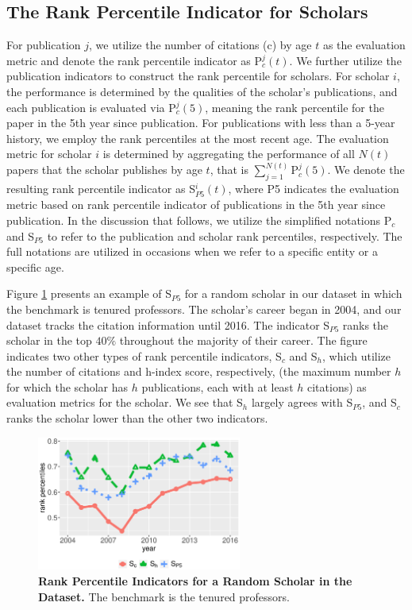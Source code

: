 \subsection*{The Rank Percentile Indicator for Scholars}

For publication $j$, we utilize the number of citations (c) by age $t$ as the evaluation metric and denote the rank percentile indicator as P$_c^{j}(t)$. We further utilize the publication indicators to construct the rank percentile for scholars. For scholar $i$, the performance is determined by the qualities of the scholar's publications, and each publication is evaluated via P$_c^{j}(5)$, meaning the rank percentile for the paper in the 5th year since publication. For publications with less than a 5-year history, we employ the rank percentiles at the most recent age. The evaluation metric for scholar $i$ is determined by aggregating the performance of all $N(t)$ papers that the scholar publishes by age $t$, that is $\displaystyle \sum_{j=1}^{N(t)} \text{P}_c^{j}(5)$. We denote the resulting rank percentile indicator as S$_{P5}^{i}(t)$, where P5 indicates the evaluation metric based on rank percentile indicator of publications in the 5th year since publication. In the discussion that follows, we utilize the simplified notations P$_c$ and S$_{P5}$ to refer to the publication and scholar rank percentiles, respectively. The full notations are utilized in occasions when we refer to a specific entity or a specific age. 

Figure \ref{fig:auti} presents an example of S$_{P5}$ for a random scholar in our dataset in which the benchmark is tenured professors. The scholar's career began in 2004, and our dataset tracks the citation information until 2016. The indicator S$_{P5}$ ranks the scholar in the top $40\%$ throughout the majority of their career. The figure indicates two other types of rank percentile indicators, S$_c$ and S$_h$, which utilize the number of citations and h-index score, respectively, (the maximum number $h$ for which the scholar has $h$ publications, each with at least $h$ citations) as evaluation metrics for the scholar. We see that S$_h$ largely agrees with S$_{P5}$, and S$_c$ ranks the scholar lower than the other two indicators. 

\begin{figure}[ht!]
    \centering
    \includegraphics[width=0.6\textwidth]{figures/compare_autrp/auti.eps}
    \caption{{\bf Rank Percentile Indicators for a Random Scholar in the Dataset.} 
    The benchmark is the tenured professors.}
    \label{fig:auti}
\end{figure}

